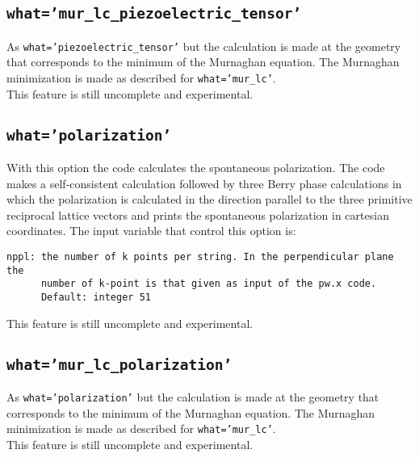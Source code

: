 \documentclass[12pt,a4paper]{article}
\begin{document}
\subsection{\texttt{what='mur\_lc\_piezoelectric\_tensor'}}
As \texttt{what='piezoelectric\_tensor'} but the calculation is made at the
geometry that corresponds to the minimum of the Murnaghan equation. The
Murnaghan minimization is made as described for \texttt{what='mur\_lc'}. \\
This feature is still uncomplete and experimental.

\subsection{\texttt{what='polarization'}}
With this option the code calculates the spontaneous polarization.
The code makes a self-consistent calculation followed by three Berry
phase calculations in which the polarization is calculated in the
direction parallel to the three primitive reciprocal lattice vectors and 
prints the spontaneous polarization in cartesian coordinates.
The input variable that control this option is:
\begin{verbatim}
nppl: the number of k points per string. In the perpendicular plane the
      number of k-point is that given as input of the pw.x code.
      Default: integer 51
\end{verbatim}
This feature is still uncomplete and experimental.

\subsection{\texttt{what='mur\_lc\_polarization'}}
As \texttt{what='polarization'} but the calculation is made at the
geometry that corresponds to the minimum of the Murnaghan equation. The
Murnaghan minimization is made as described for \texttt{what='mur\_lc'}.\\
This feature is still uncomplete and experimental.
\end{document}

